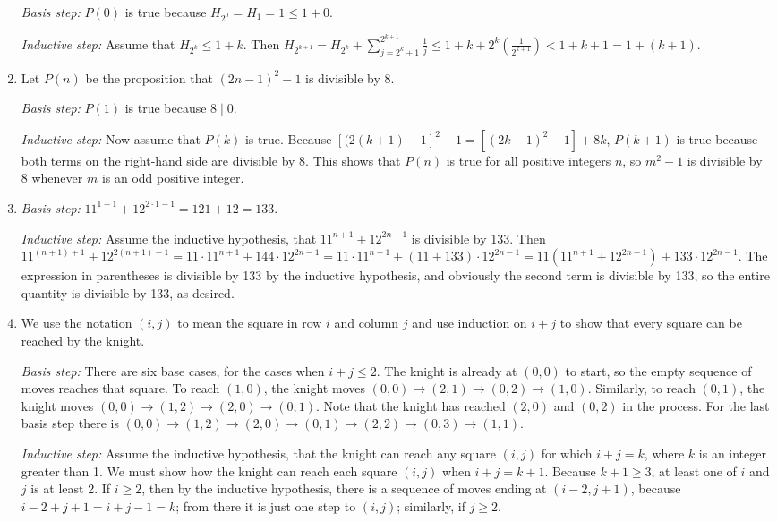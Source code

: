 \documentclass{../../cls/sig-alternate-05-2015}
\begin{document}
\begin{enumerate}
\textit{Basis step:} $P(0)$ is true because $H_{2^0} = H_1 = 1 \le 1 + 0$.

\textit{Inductive step:} Assume that $H_{2^k} \le 1 + k$.
Then $H_{2^{k + 1}} = H_{2^k} + \sum_{j = 2^k + 1}^{2^{k + 1}} \frac{1}{j} \le 1 + k + 2^k \left(\frac{1}{2^{k + 1}}\right) < 1 + k + 1 = 1 + (k + 1)$.

\item Let $P(n)$ be the proposition that $(2n - 1)^2 - 1$ is divisible by
8.

\textit{Basis step:} $P(1)$ is true because $8 \mid 0$.

\textit{Inductive step:} Now assume that $P(k)$ is true.
Because $[(2(k + 1) - 1]^2 - 1 = [(2k - 1)^2 - 1] + 8k$,
$P(k + 1)$ is true because both terms on the right-hand side are divisible by 8.
This shows that $P(n)$ is true for all positive integers $n$,
so $m^2 - 1$ is divisible by 8 whenever $m$ is an odd positive integer.

\item \textit{Basis step:} $11^{1 + 1} + 12^{2 \cdot 1 - 1} = 121 + 12 = 133$.

\textit{Inductive step:} Assume the inductive hypothesis,
that $11^{n + 1} + 12^{2n - 1}$ is divisible by 133.
Then $11^{(n + 1) + 1} + 12^{2(n+1) - 1} = 11 \cdot 11^{n + 1} + 144 \cdot 12^{2n - 1} = 11 \cdot 11^{n + 1} + (11 + 133) \cdot 12^{2n - 1} = 11(11^{n + 1} + 12^{2n - 1}) + 133 \cdot 12^{2n - 1}$.
The expression in parentheses is divisible by 133 by the inductive hypothesis,
and obviously the second term is divisible by 133,
so the entire quantity is divisible by 133, as desired.

\item We use the notation $(i, j)$ to mean the square
in row $i$ and column $j$ and use induction on $i + j$ to show that every square can be reached by the knight.

\textit{Basis step:} There are six base cases, for the cases when $i + j \le 2$.
The knight is already at $(0, 0)$ to start,
so the empty sequence of moves reaches that square.
To reach $(1, 0)$,
the knight moves $(0, 0) \rightarrow (2, 1) \rightarrow (0, 2) \rightarrow (1, 0)$.
Similarly, to reach $(0, 1)$,
the knight moves $(0, 0) \rightarrow (1, 2) \rightarrow (2, 0) \rightarrow (0, 1)$.
Note that the knight has reached $(2, 0)$ and $(0, 2)$ in the process.
For the last basis step there is $(0, 0) \rightarrow (1, 2) \rightarrow (2, 0) \rightarrow (0, 1) \rightarrow (2, 2) \rightarrow (0, 3) \rightarrow (1, 1)$.

\textit{Inductive step:} Assume the inductive hypothesis,
that the knight can reach any square $(i, j)$ for which $i + j = k$,
where $k$ is an integer greater than 1.
We must show how the knight can reach each square $(i, j)$ when $i + j = k + 1$.
Because $k + 1 \ge 3$,
at least one of $i$ and $j$ is at least 2.
If $i \ge 2$,
then by the inductive hypothesis,
there is a sequence of moves ending at $(i - 2, j + 1)$,
because $i - 2 + j + 1 = i + j - 1 = k$;
from there it is just one step to $(i, j)$;
similarly, if $j \ge 2$.


\end{enumerate}
\end{document}
